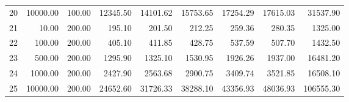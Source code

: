 \begin{table}[ht]
\begin{tabular}{rrrrrrrrr}
  20 & 10000.00 & 100.00 & 12345.50 & 14101.62 & 15753.65 & 17254.29 & 17615.03 & 31537.90 \\ 
  21 & 10.00 & 200.00 & 195.10 & 201.50 & 212.25 & 259.36 & 280.35 & 1325.00 \\ 
  22 & 100.00 & 200.00 & 405.10 & 411.85 & 428.75 & 537.59 & 507.70 & 1432.50 \\ 
  23 & 500.00 & 200.00 & 1295.90 & 1325.10 & 1530.95 & 1926.26 & 1937.00 & 16481.20 \\ 
  24 & 1000.00 & 200.00 & 2427.90 & 2563.68 & 2900.75 & 3409.74 & 3521.85 & 16508.10 \\ 
  25 & 10000.00 & 200.00 & 24652.60 & 31726.33 & 38288.10 & 43356.93 & 48036.93 & 106555.30 \\ 
   \hline
\end{tabular}
\end{table}
